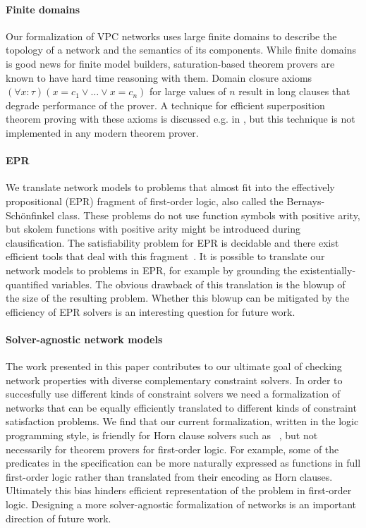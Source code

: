 \paragraph{Finite domains}
Our formalization of VPC networks uses large finite domains to describe the topology of a network and the semantics of its components. While finite domains is good news for finite model builders, saturation-based theorem provers are known to have hard time reasoning with them. Domain closure axioms $(\forall x:\tau)(x=c_1 \vee\ldots\vee x=c_n)$ for large values of $n$ result in long clauses that degrade performance of the prover. A technique for efficient superposition theorem proving with these axioms is discussed e.g. in \cite{HillenbrandWeidenbach13}, but this technique is not implemented in any modern theorem prover.

\paragraph{EPR}
We translate network models to problems that almost fit into the effectively propositional (EPR) fragment of first-order logic, also called the Bernays-Sch\"onfinkel class. These problems do not use function symbols with positive arity, but skolem functions with positive arity might be introduced during clausification. The satisfiability problem for EPR is decidable and there exist efficient tools that deal with this fragment~\cite{DBLP:conf/birthday/Korovin13}. It is possible to translate our network models to problems in EPR, for example by grounding the existentially-quantified variables. The obvious drawback of this translation is the blowup of the size of the resulting problem. Whether this blowup can be mitigated by the efficiency of EPR solvers is an interesting question for future work.

\paragraph{Solver-agnostic network models}
The work presented in this paper contributes to our ultimate goal of checking network properties with diverse complementary constraint solvers. In order to succesfully use different kinds of constraint solvers we need a formalization of networks that can be equally efficiently translated to different kinds of constraint satisfaction problems. We find that our current formalization, written in the logic programming style, is friendly for Horn clause solvers such as \Datalog~\cite{Datalog}, but not necessarily for theorem provers for first-order logic. For example, some of the predicates in the specification can be more naturally expressed as functions in full first-order logic rather than translated from their encoding as Horn clauses. Ultimately this bias hinders efficient representation of the problem in first-order logic. Designing a more solver-agnostic formalization of networks is an important direction of future work.

